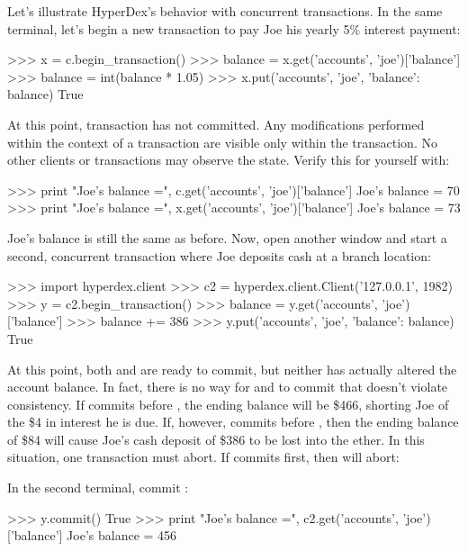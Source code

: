 Let's illustrate HyperDex's behavior with concurrent transactions.
In the same terminal, let's begin a new transaction to pay Joe his yearly
5\% interest payment:

\begin{pyconcode}
>>> x = c.begin_transaction()
>>> balance = x.get('accounts', 'joe')['balance']
>>> balance = int(balance * 1.05)
>>> x.put('accounts', 'joe', {'balance': balance})
True
\end{pyconcode}

At this point, transaction  has not committed.  Any modifications performed
within the context of a transaction are visible only within the transaction.  No
other clients or transactions may observe the state.  Verify this for yourself
with:

\begin{pyconcode}
>>> print "Joe's balance =", c.get('accounts', 'joe')['balance']
Joe's balance = 70
>>> print "Joe's balance =", x.get('accounts', 'joe')['balance']
Joe's balance = 73
\end{pyconcode}

Joe's balance is still the same as before.  Now, open another window and start a
second, concurrent transaction where Joe deposits cash at a branch location:

\begin{pyconcode}
>>> import hyperdex.client
>>> c2 = hyperdex.client.Client('127.0.0.1', 1982)
>>> y = c2.begin_transaction()
>>> balance = y.get('accounts', 'joe')['balance']
>>> balance += 386
>>> y.put('accounts', 'joe', {'balance': balance})
True
\end{pyconcode}

At this point, both  and  are ready to commit, but neither has
actually altered the account balance.  In fact, there is no way for  and
 to commit that doesn't violate consistency.  If  commits before
, the ending balance will be \$466, shorting Joe of the \$4 in interest
he is due.  If, however,  commits before , then the ending
balance of \$84 will cause Joe's cash deposit of \$386 to be lost into the
ether.  In this situation, one transaction must abort.  If  commits
first, then  will abort:

In the second terminal, commit :

\begin{pyconcode}
>>> y.commit()
True
>>> print "Joe's balance =", c2.get('accounts', 'joe')['balance']
Joe's balance = 456
\end{pyconcode}

